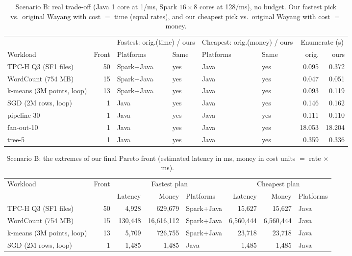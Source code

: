 \documentclass[10pt,a4paper]{article}
\begin{document}
\begin{table}[h]\centering\small
\caption{Scenario B: real trade-off (Java 1 core at 1/ms, Spark $16\times8$ cores at 128/ms), no budget. Our fastest pick vs.\ original Wayang with cost $=$ time (equal rates), and our cheapest pick vs.\ original Wayang with cost $=$ money.}\label{tab:parityB}
\begin{tabular}{@{}lr|ll|ll|rr@{}}
\toprule
& & \multicolumn{2}{c|}{Fastest: orig.(time) / ours} & \multicolumn{2}{c|}{Cheapest: orig.(money) / ours} & \multicolumn{2}{c}{Enumerate (s)}\\
Workload & Front & Platforms & Same & Platforms & Same & orig. & ours\\
\midrule
TPC-H Q3 (SF1 files) & 50 & Spark+Java & yes & Java & yes & 0.095 & 0.372\\
WordCount (754 MB) & 15 & Spark+Java & yes & Java & yes & 0.047 & 0.051\\
k-means (3M points, loop) & 13 & Spark+Java & yes & Java & yes & 0.093 & 0.119\\
SGD (2M rows, loop) & 1 & Java & yes & Java & yes & 0.146 & 0.162\\
pipeline-30 & 1 & Java & yes & Java & yes & 0.111 & 0.110\\
fan-out-10 & 1 & Java & yes & Java & yes & 18.053 & 18.204\\
tree-5 & 1 & Java & yes & Java & yes & 0.359 & 0.336\\
\bottomrule
\end{tabular}
\end{table}

\begin{table}[h]\centering\small
\caption{Scenario B: the extremes of our final Pareto front (estimated latency in ms, money in cost units $=$ rate $\times$ ms).}\label{tab:frontsB}
\begin{tabular}{@{}lr|rrl|rrl@{}}
\toprule
Workload & Front & \multicolumn{3}{c|}{Fastest plan} & \multicolumn{3}{c}{Cheapest plan}\\
& & Latency & Money & Platforms & Latency & Money & Platforms\\
\midrule
TPC-H Q3 (SF1 files) & 50 & 4{,}928 & 629{,}679 & Spark+Java & 15{,}627 & 15{,}627 & Java\\
WordCount (754 MB) & 15 & 130{,}448 & 16{,}616{,}112 & Spark+Java & 6{,}560{,}444 & 6{,}560{,}444 & Java\\
k-means (3M points, loop) & 13 & 5{,}709 & 726{,}755 & Spark+Java & 23{,}718 & 23{,}718 & Java\\
SGD (2M rows, loop) & 1 & 1{,}485 & 1{,}485 & Java & 1{,}485 & 1{,}485 & Java\\
\bottomrule
\end{tabular}
\end{table}
\end{document}
